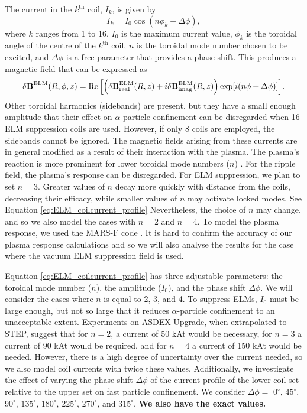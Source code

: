 \documentclass[10pt, a4paper, twoside]{article}
\begin{document}
The current in the $k^\text{th}$ coil, $I_k$, is given by
\begin{equation}
    \label{eq:ELM_coilcurrent_profile}
    I_k = I_0 \cos(n \phi_k + \Delta \phi),
\end{equation}
where $k$ ranges from 1 to 16, $I_0$ is the maximum current value, $\phi_k$ is the toroidal angle of the centre of the $k^\text{th}$ coil, $n$ is the toroidal mode number chosen to be excited, and $\Delta \phi$ is a free parameter that provides a phase shift. This produces a magnetic field that can be expressed as
\begin{equation}
    \delta\textbf{B}^\text{ELM}(R, \phi, z)=\Re\qty[\qty(\delta\textbf{B}^\text{ELM}_\text{real}(R,z) + i\delta\textbf{B}^\text{ELM}_\text{imag}(R,z))\exp[i(n\phi + \Delta \phi)]].
\end{equation}
Other toroidal harmonics (sidebands) are present, but they have a small enough amplitude that their effect on $\alpha$-particle confinement can be disregarded when 16 ELM suppression coils are used. However, if only 8 coils are employed, the sidebands cannot be ignored. The magnetic fields arising from these currents are in general modified as a result of their interaction with the plasma. The plasma's reaction is more prominent for lower toroidal mode numbers ($n$) \cite{mcclements2005}. For the ripple field, the plasma's response can be disregarded. For ELM suppression, we plan to set $n=3$. Greater values of $n$ decay more quickly with distance from the coils, decreasing their efficacy, while smaller values of $n$ may activate locked modes. See Equation \eqref{eq:ELM_coilcurrent_profile} Nevertheless, the choice of $n$ may change, and so we also model the cases with $n=2$ and $n=4$. To model the plasma response, we used the MARS-F code \cite{liu2015}. It is hard to confirm the accuracy of our plasma response calculations and so we will also analyse the results for the case where the vacuum ELM suppression field is used.

Equation \ref{eq:ELM_coilcurrent_profile} has three adjustable parameters: the toroidal mode number ($n$), the amplitude ($I_0$), and the phase shift $\Delta \phi$. We will consider the cases where $n$ is equal to 2, 3, and 4. To suppress ELMs, $I_0$ must be large enough, but not so large that it reduces $\alpha$-particle confinement to an unacceptable extent. Experiments on ASDEX Upgrade, when extrapolated to STEP, suggest that for $n=2$, a current of 50 kAt would be necessary, for $n=3$ a current of 90 kAt would be required, and for $n=4$ a current of 150 kAt would be needed. However, there is a high degree of uncertainty over the current needed, so we also model coil currents with twice these values. Additionally, we investigate the effect of varying the phase shift $\Delta\phi$ of the current profile of the lower coil set relative to the upper set on fast particle confinement. We consider $\Delta\phi =$ $0^\circ$, $45^\circ$, $90^\circ$, $135^\circ$, $180^\circ$, $225^\circ$, $270^\circ$, and $315^\circ$. \textbf{We also have the exact values.}
\end{document}
